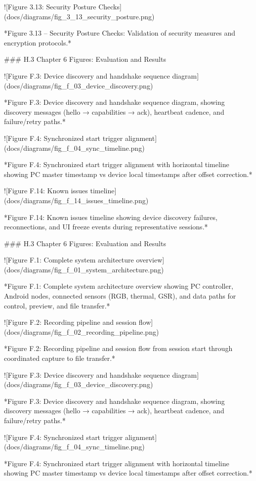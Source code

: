 \documentclass[12pt,a4paper]{article}
\begin{document}
{![Figure 3.13: Security Posture Checks](docs/diagrams/fig_3_13_security_posture.png)

*Figure 3.13 – Security Posture Checks: Validation of security measures and encryption protocols.*

### H.3 Chapter 6 Figures: Evaluation and Results

![Figure F.3: Device discovery and handshake sequence diagram](docs/diagrams/fig_f_03_device_discovery.png)

*Figure F.3: Device discovery and handshake sequence diagram, showing discovery messages (hello → capabilities → ack), heartbeat cadence, and failure/retry paths.*

![Figure F.4: Synchronized start trigger alignment](docs/diagrams/fig_f_04_sync_timeline.png)

*Figure F.4: Synchronized start trigger alignment with horizontal timeline showing PC master timestamp vs device local timestamps after offset correction.*

![Figure F.14: Known issues timeline](docs/diagrams/fig_f_14_issues_timeline.png)

*Figure F.14: Known issues timeline showing device discovery failures, reconnections, and UI freeze events during representative sessions.*

### H.3 Chapter 6 Figures: Evaluation and Results

![Figure F.1: Complete system architecture overview](docs/diagrams/fig_f_01_system_architecture.png)

*Figure F.1: Complete system architecture overview showing PC controller, Android nodes, connected sensors (RGB, thermal, GSR), and data paths for control, preview, and file transfer.*

![Figure F.2: Recording pipeline and session flow](docs/diagrams/fig_f_02_recording_pipeline.png)

*Figure F.2: Recording pipeline and session flow from session start through coordinated capture to file transfer.*

![Figure F.3: Device discovery and handshake sequence diagram](docs/diagrams/fig_f_03_device_discovery.png)

*Figure F.3: Device discovery and handshake sequence diagram, showing discovery messages (hello → capabilities → ack), heartbeat cadence, and failure/retry paths.*

![Figure F.4: Synchronized start trigger alignment](docs/diagrams/fig_f_04_sync_timeline.png)

*Figure F.4: Synchronized start trigger alignment with horizontal timeline showing PC master timestamp vs device local timestamps after offset correction.*

}
\end{document}
